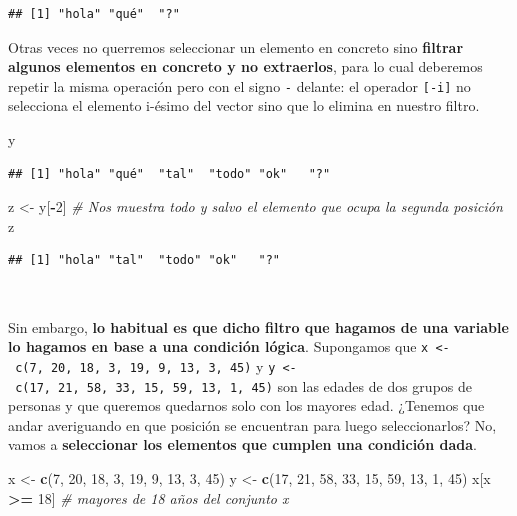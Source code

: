 \documentclass[11pt,]{book}
\newenvironment{Shaded}{\begin{snugshade}}{\end{snugshade}}
\newcommand{\CommentTok}[1]{\textcolor[rgb]{0.37,0.37,0.37}{\textit{#1}}}
\newcommand{\DecValTok}[1]{\textcolor[rgb]{0.06,0.06,0.06}{#1}}
\newcommand{\KeywordTok}[1]{\textcolor[rgb]{0.27,0.27,0.27}{\textbf{#1}}}
\newcommand{\NormalTok}[1]{#1}
\newcommand{\OperatorTok}[1]{\textcolor[rgb]{0.43,0.43,0.43}{\textbf{#1}}}
\newcommand{\StringTok}[1]{\textcolor[rgb]{0.5,0.5,0.5}{#1}}
\begin{document}
\begin{verbatim}
## [1] "hola" "qué"  "?"
\end{verbatim}

Otras veces no querremos seleccionar un elemento en concreto sino \textbf{filtrar algunos elementos en concreto y no extraerlos}, para lo cual deberemos repetir la misma operación pero con el signo \texttt{-} delante: el operador \texttt{{[}-i{]}} no selecciona el elemento i-ésimo del vector sino que lo elimina en nuestro filtro.

\begin{Shaded}
\begin{Highlighting}[]
\NormalTok{y}
\end{Highlighting}
\end{Shaded}

\begin{verbatim}
## [1] "hola" "qué"  "tal"  "todo" "ok"   "?"
\end{verbatim}

\begin{Shaded}
\begin{Highlighting}[]
\NormalTok{z <-}\StringTok{ }\NormalTok{y[}\OperatorTok{-}\DecValTok{2}\NormalTok{] }\CommentTok{# Nos muestra todo y salvo el elemento que ocupa la segunda posición}
\NormalTok{z}
\end{Highlighting}
\end{Shaded}

\begin{verbatim}
## [1] "hola" "tal"  "todo" "ok"   "?"
\end{verbatim}

~

Sin embargo, \textbf{lo habitual es que dicho filtro que hagamos de una variable lo hagamos en base a una condición lógica}. Supongamos que \texttt{x\ \textless{}-\ c(7,\ 20,\ 18,\ 3,\ 19,\ 9,\ 13,\ 3,\ 45)} y \texttt{y\ \textless{}-\ c(17,\ 21,\ 58,\ 33,\ 15,\ 59,\ 13,\ 1,\ 45)} son las edades de dos grupos de personas y que queremos quedarnos solo con los mayores edad. ¿Tenemos que andar averiguando en que posición se encuentran para luego seleccionarlos? No, vamos a \textbf{seleccionar los elementos que cumplen una condición dada}.

\begin{Shaded}
\begin{Highlighting}[]
\NormalTok{x <-}\StringTok{ }\KeywordTok{c}\NormalTok{(}\DecValTok{7}\NormalTok{, }\DecValTok{20}\NormalTok{, }\DecValTok{18}\NormalTok{, }\DecValTok{3}\NormalTok{, }\DecValTok{19}\NormalTok{, }\DecValTok{9}\NormalTok{, }\DecValTok{13}\NormalTok{, }\DecValTok{3}\NormalTok{, }\DecValTok{45}\NormalTok{)}
\NormalTok{y <-}\StringTok{ }\KeywordTok{c}\NormalTok{(}\DecValTok{17}\NormalTok{, }\DecValTok{21}\NormalTok{, }\DecValTok{58}\NormalTok{, }\DecValTok{33}\NormalTok{, }\DecValTok{15}\NormalTok{, }\DecValTok{59}\NormalTok{, }\DecValTok{13}\NormalTok{, }\DecValTok{1}\NormalTok{, }\DecValTok{45}\NormalTok{)}
\NormalTok{x[x }\OperatorTok{>=}\StringTok{ }\DecValTok{18}\NormalTok{] }\CommentTok{# mayores de 18 años del conjunto x}
\end{Highlighting}
\end{Shaded}
\end{document}
